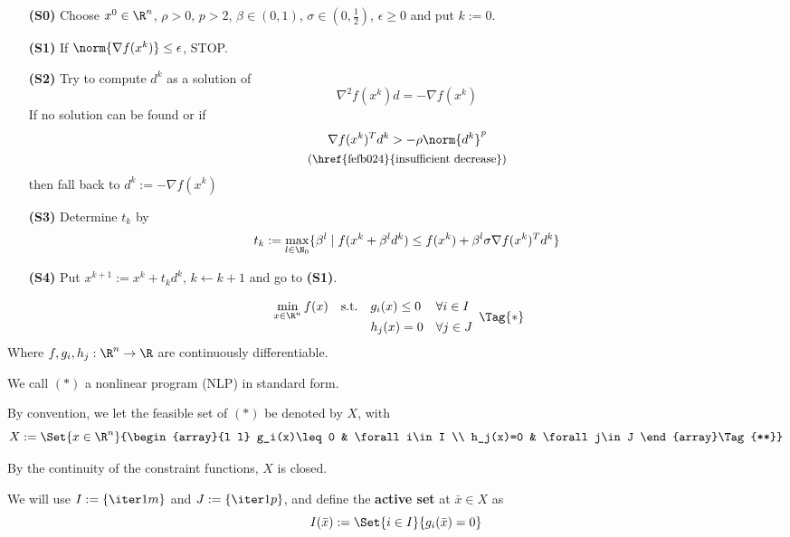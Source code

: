 \begin{enumerate}
	\item [\textbf{(S0)}] Choose $x^0\in\R^n$, $\rho>0$, $p>2$, $\beta\in(0,1)$, $\sigma\in(0,\frac12)$, $\epsilon\geq0$ and put $k:=0$.
	\item [\textbf{(S1)}] If $\norm{\nabla f(x^k)}\leq\epsilon$, STOP.
	\item [\textbf{(S2)}] Try to compute $d^k$ as a solution of
	      $$\nabla^2f(x^k)d=-\nabla f(x^k)$$
	      If no solution can be found or if
	      \begin{gather*}
		      \nabla f(x^k)^Td^k>-\rho\norm{d^k}^p\\
		      \text{\small{(\href{fefb024}{insufficient decrease})}}
	      \end{gather*}
	      then fall back to $d^k:=-\nabla f(x^k)$
	\item [\textbf{(S3)}] Determine $t_k$ by
	      $$t_k:=\max_{l\in\N_0}\{\beta^l\mid f(x^k+\beta^ld^k)\leq f(x^k)+\beta^l\sigma\nabla f(x^k)^Td^k\}$$
	\item [\textbf{(S4)}] Put $x^{k+1}:=x^k+t_kd^k$, $k\gets k+1$ and go to \textbf{(S1)}.
\end{enumerate}

\label{bbe9993}

\begin{equation*}
	\begin{array}{l l l l}
		\displaystyle \min_{x\in\R^n}f(x)
		 & \text{s.t.} & g_i(x)\leq0 & \forall i\in I \\
		 &             & h_j(x)=0    & \forall j\in J
	\end{array}\Tag{*}
\end{equation*}
Where $f,g_i,h_j:\R^n\to\R$ are continuously differentiable.

We call $(*)$ a nonlinear program (NLP) in standard form.

By convention, we let the feasible set of $(*)$ be denoted by $X$, with
\begin{equation*}
	X:=\Set{x\in\R^n}{\begin{array}{l l}
			g_i(x)\leq0 & \forall i\in I \\
			h_j(x)=0    & \forall j\in J
		\end{array}\Tag{**}}
\end{equation*}

By the continuity of the constraint functions, $X$ is closed.

We will use $I:=\{\iter1m\}$ and $J:=\{\iter1p\}$, and define the
\textbf{active set} at $\bar x\in X$ as
$$
	I(\bar x):=\Set{i\in I}{g_i(\bar x)=0}
$$

